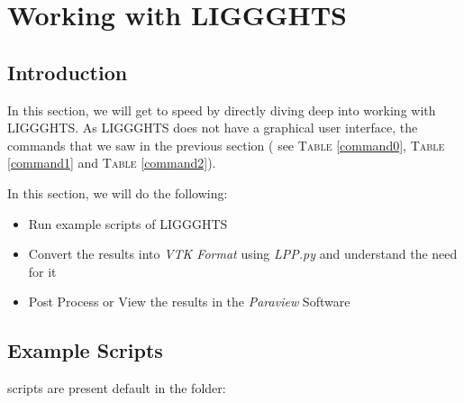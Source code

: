 \documentclass{tufte-book} %
\begin{document}

\chapter{Working with LIGGGHTS}
\label{ch:2}

\section[Introduction]{Introduction}

\begin{fullwidth}
  In this section, we will get to speed by directly diving deep into working with LIGGGHTS. As LIGGGHTS does not have a graphical user interface, the commands that we saw in the previous section ( see \textsc{Table} \ref{command0}, \textsc{Table} \ref{command1} and \textsc{Table} \ref{command2}).
  \end{fullwidth}


  In this section, we will do the following:
  \begin{itemize}
  \item Run example scripts of LIGGGHTS
  \item Convert the results into \textit{VTK Format} using \textit{LPP.py} and understand the need for it
  \item Post Process or View the results in the \textit{Paraview} Software
  
  \end{itemize}

 \section[Example Scripts]{Example Scripts}

  scripts are present default in the folder:
\end{document}
